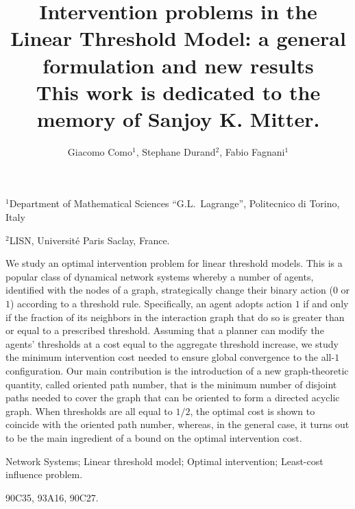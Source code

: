 \documentclass[12pt,twoside,reqno]{amsart}
\theoremstyle{definition}
\numberwithin{equation}{section}
\newcommand{\0}{\mathbf{0}}
\newcommand{\1}{\mathbf{1}}
\begin{document}
\setcounter{page}{1}







\vspace*{2.0cm}
\title[Intervention problems in the Linear Threshold Model]
{Intervention problems in the Linear Threshold Model: a general formulation and new results\\[7pt]
{\small This work is dedicated to the memory of Sanjoy K. Mitter.}}
\author[G.~Como, S.~Durand, F.~Fagnani]{ Giacomo Como$^{1}$, Stephane Durand$^{2}$, Fabio Fagnani$^{1}$}
\maketitle
\vspace*{-0.6cm}


\begin{center}
{\footnotesize

$^1$Department of Mathematical Sciences ``G.L.~Lagrange'', Politecnico di Torino, Italy

$^2$LISN,  Universit\'e Paris Saclay, France.  

}\end{center}



\vskip 4mm {\footnotesize {}
We study an optimal intervention problem for  linear threshold models. This is a popular class of dynamical network systems whereby a number of agents, identified with the nodes of a graph, strategically change their binary action ($0$ or $1$) according to a threshold rule. Specifically, an agent adopts action $1$ if and only if the fraction of its neighbors in the interaction graph that do so is greater than or equal to a prescribed threshold. Assuming that a planner can modify the agents' thresholds at a cost equal to the aggregate threshold increase, we study the minimum intervention cost needed to ensure global convergence to the all-$1$ configuration. Our main contribution is the introduction of a new graph-theoretic quantity, called oriented path number,  that is the minimum number of disjoint paths needed to cover the graph that can be oriented to form a directed acyclic graph.  When thresholds are all equal to $1/2$, the optimal cost is shown to coincide with  the oriented path number, whereas, in the general case, it turns out to be the main ingredient of a bound on the optimal intervention cost.


  Network Systems; 
Linear threshold model; Optimal intervention; Least-cost influence problem. 

 90C35, 93A16, 90C27. }
\end{document}
